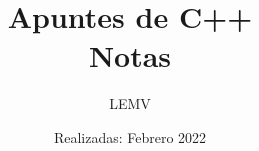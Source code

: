 \documentclass{article}
\title{Apuntes de C++\\
\Large{Notas}}
\author{LEMV}
\date{Realizadas: Febrero 2022}
\begin{document}
\renewcommand*\contentsname{Índice}

\maketitle\newpage
\tableofcontents\newpage
\listoftables\newpage







\end{document}
